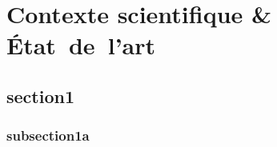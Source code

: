 \documentclass[a4paper,11pt,twoside]{StyleThese}
\begin{document}
\setcounter{chapter}{0} %
\dominitoc
\faketableofcontents
\fi

\chapter{Contexte scientifique \& État~de~l'art}
\minitoc

\section{section1}
\subsection{subsection1a}

\ifdefined{}
\else


\end{document}
